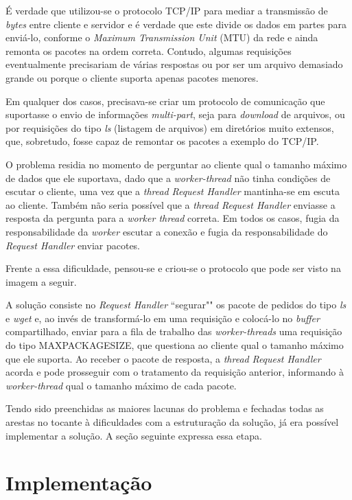 \documentclass[12pt]{article}
\begin{document}
É verdade que utilizou-se o protocolo TCP/IP para mediar a transmissão de \textit{bytes} entre cliente e servidor e é verdade que este divide os dados em partes para enviá-lo, conforme o \textit{Maximum Transmission Unit} (MTU) da rede e ainda remonta os pacotes na ordem correta. Contudo, algumas requisições eventualmente precisariam de várias respostas ou por ser um arquivo demasiado grande ou porque o cliente suporta apenas pacotes menores.

Em qualquer dos casos, precisava-se criar um protocolo de comunicação que suportasse o envio de informações \textit{multi-part}, seja para \textit{download} de arquivos, ou por requisições do tipo \emph{ls} (listagem de arquivos) em diretórios muito extensos, que, sobretudo, fosse capaz de remontar os pacotes a exemplo do TCP/IP.

O problema residia no momento de perguntar ao cliente qual o tamanho máximo de dados que ele suportava, dado que a \textit{worker-thread} não tinha condições de escutar o cliente, uma vez que a \textit{thread} \textit{Request Handler} mantinha-se em escuta ao cliente. Também não seria possível que a \textit{thread} \textit{Request Handler} enviasse a resposta da pergunta para a \textit{worker thread} correta. Em todos os casos, fugia da responsabilidade da \textit{worker} escutar a conexão e fugia da responsabilidade do \textit{Request Handler} enviar pacotes.

Frente a essa dificuldade, pensou-se e criou-se o protocolo que pode ser visto na imagem a seguir.

A solução consiste no \textit{Request Handler} ``segurar"" os pacote de pedidos do tipo \emph{ls} e \emph{wget} e, ao invés de transformá-lo em uma requisição e colocá-lo no \textit{buffer} compartilhado, enviar para a fila de trabalho das \textit{worker-threads} uma requisição do tipo MAXPACKAGESIZE, que questiona ao cliente qual o tamanho máximo que ele suporta. Ao receber o pacote de resposta, a \textit{thread} \textit{Request Handler} acorda e pode prosseguir com o tratamento da requisição anterior, informando à \textit{worker-thread} qual o tamanho máximo de cada pacote.

Tendo sido preenchidas as maiores lacunas do problema e fechadas todas as arestas no tocante à dificuldades com a estruturação da solução, já era possível implementar a solução. A seção seguinte expressa essa etapa.

\section{Implementação}
\end{document}
